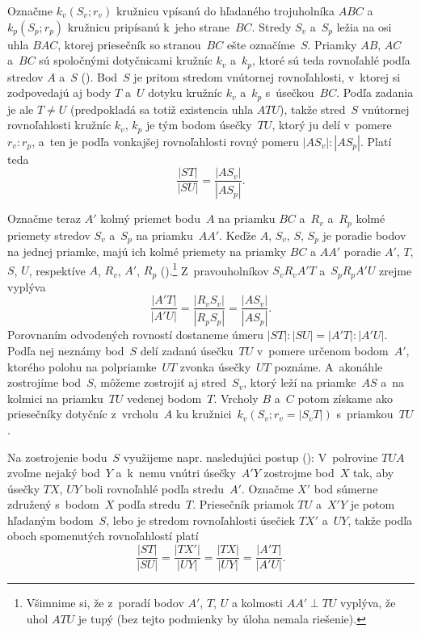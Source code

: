 {%
Označme $k_v (S_v; r_v)$ kružnicu vpísanú do hľadaného trojuholníka $ABC$
a~$k_p (S_p; r_p)$ kružnicu pripísanú k~jeho strane~$BC$. Stredy $S_v$ a~$S_p$
ležia na osi uhla $BAC$, ktorej priesečník so stranou~$BC$
ešte označíme~$S$. Priamky $AB$, $AC$ a~$BC$ sú
spoločnými dotyčnicami kružníc $k_v$ a~$k_p$, ktoré sú teda rovnoľahlé
podľa stredov $A$ a~$S$ (\obr).
%
Bod~$S$ je pritom stredom vnútornej rovnoľahlosti, v~ktorej si zodpovedajú
aj body $T$ a~$U$ dotyku kružníc $k_v$ a~$k_p$ s~úsečkou~$BC$.
Podľa zadania je ale $T\ne U$
(predpokladá sa totiž existencia uhla $ATU$), takže stred~$S$
vnútornej rovnoľahlosti kružníc $k_v$, $k_p$ je tým bodom
úsečky~$TU$, ktorý ju delí v~pomere $r_v:r_p$, a~ten je podľa
vonkajšej rovnoľahlosti rovný pomeru $|AS_v|:|AS_p|$. Platí teda
$$
\frac{|ST|}{|SU|}=\frac{|AS_v|}{|AS_p|}.
$$

Označme teraz $A'$ kolmý priemet bodu~$A$ na priamku $BC$ a~$R_v$
a~$R_p$ kolmé priemety stredov $S_v$ a~$S_p$ na priamku~$AA'$. Keďže $A$,
$S_v$, $S$, $S_p$ je poradie bodov na jednej priamke, majú ich
kolmé priemety na priamky $BC$ a $AA'$ poradie $A'$, $T$, $S$, $U$,
respektíve $A$, $R_v$, $A'$, $R_p$ ().\footnote{Všimnime si,
že z~poradí bodov $A'$, $T$, $U$ a kolmosti $AA'\perp TU$ vyplýva,
že uhol $ATU$ je tupý (bez tejto podmienky by úloha nemala riešenie).}
Z~pravouholníkov $S_vR_vA'T$
a~$S_pR_pA'U$ zrejme vyplýva
$$
\frac{|A'T|}{|A'U|}=\frac{|R_vS_v|}{|R_pS_p|}=\frac{|AS_v|}{|AS_p|}. %
$$
Porovnaním odvodených rovností dostaneme úmeru
$|ST|:|SU|=|A'T|:|A'U|$. Podľa nej neznámy bod~$S$ delí zadanú
úsečku~$TU$ v~pomere určenom bodom~$A'$, ktorého polohu
na polpriamke~$UT$ zvonka úsečky~$UT$ poznáme. A~akonáhle zostrojíme bod~$S$, môžeme zostrojiť
aj stred~$S_v$, ktorý leží na priamke~$AS$ a~na kolmici na priamku~$TU$ vedenej bodom~$T$.
Vrcholy $B$ a~$C$ potom získame ako priesečníky dotyčníc z~vrcholu~$A$
ku kružnici~$k_v(S_v;r_v=|S_vT|)$ s~priamkou~$TU$.

Na zostrojenie bodu~$S$ využijeme napr. nasledujúci postup (\obr):
%
V~polrovine $TUA$ zvoľme nejaký bod~$Y$ a~k~nemu vnútri úsečky~$A'Y$ zostrojme
bod~$X$ tak, aby úsečky $TX$, $UY$ boli rovnoľahlé podľa stredu~$A'$.
Označme $X'$ bod súmerne združený s~bodom~$X$ podľa stredu~$T$.
Priesečník priamok $TU$ a~$X'Y$ je potom hľadaným bodom~$S$, lebo je stredom
rovnoľahlosti úsečiek $TX'$ a~$UY$, takže podľa oboch spomenutých rovnoľahlostí platí
$$
\frac{|ST|}{|SU|}=\frac{|TX'|}{|UY|}=\frac{|TX|}{|UY|}=\frac{|A'T|}{|A'U|}.
$$

}
